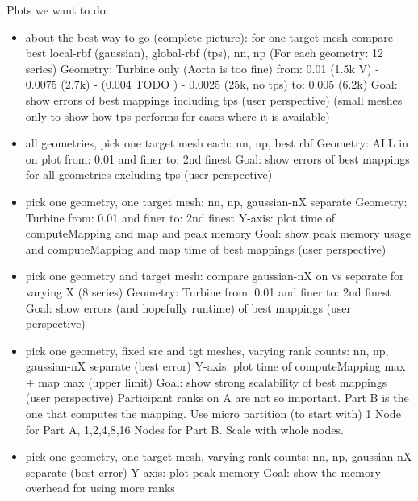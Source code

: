 Plots we want to do:
\begin{itemize}
  \item about the best way to go (complete picture): for one target mesh compare best local-rbf (gaussian), global-rbf (tps), nn, np (For each geometry: 12 series)
    Geometry: Turbine only (Aorta is too fine)
    from: 0.01 (1.5k V) - 0.0075 (2.7k) -  (0.004 TODO ) - 0.0025 (25k, no tps)
    to: 0.005 (6.2k)
    Goal: show errors of best mappings including tps (user perspective) (small meshes only to show how tps performs for cases where it is available)

  \item all geometries, pick one target mesh each: nn, np, best rbf
    Geometry: ALL in on plot
    from: 0.01 and finer
    to: 2nd finest
    Goal: show errors of best mappings for all geometries excluding tps (user perspective)

  \item pick one geometry, one target mesh: nn, np, gaussian-nX separate
    Geometry: Turbine
    from: 0.01 and finer
    to: 2nd finest
    Y-axis: plot time of computeMapping and map and peak memory
    Goal: show peak memory usage and computeMapping and map time of best mappings (user perspective)

  \item pick one geometry and target mesh: compare gaussian-nX on vs separate for varying X (8 series)
    Geometry: Turbine
    from: 0.01 and finer
    to: 2nd finest
    Goal: show errors (and hopefully runtime) of best mappings (user perspective)

  \item pick one geometry, fixed src and tgt meshes, varying rank counts: nn, np, gaussian-nX separate (best error)
    Y-axis: plot time of computeMapping max + map max (upper limit) 
    Goal: show strong scalability of best mappings (user perspective)
    Participant ranks on A are not so important. Part B is the one that computes the mapping.
    Use micro partition (to start with) 1 Node for Part A, 1,2,4,8,16 Nodes for Part B. Scale with whole nodes.

  \item pick one geometry, one target mesh, varying rank counts: nn, np, gaussian-nX separate (best error)
    Y-axis: plot peak memory 
    Goal: show the memory overhead for using more ranks


\end{itemize}
